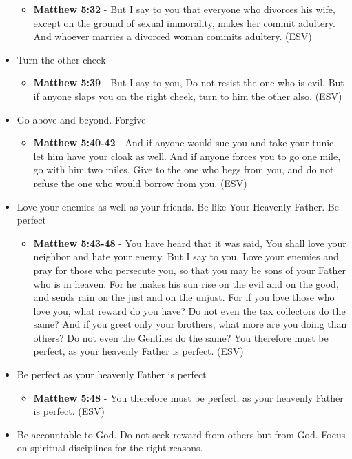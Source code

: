 \documentclass[11pt]{article}
\begin{document}
\begin{itemize}
\begin{itemize}
\item \textbf{Matthew 5:32} - But I say to you that everyone who divorces his wife, except on the ground of sexual immorality, makes her commit adultery. And whoever marries a divorced woman commits adultery. (ESV)
\end{itemize}
\item Turn the other cheek
\begin{itemize}
\item \textbf{Matthew 5:39} - But I say to you, Do not resist the one who is evil. But if anyone slaps you on the right cheek, turn to him the other also. (ESV)
\end{itemize}
\item Go above and beyond. Forgive 
\begin{itemize}
\item \textbf{Matthew 5:40-42} - And if anyone would sue you and take your tunic, let him have your cloak as well. And if anyone forces you to go one mile, go with him two miles. Give to the one who begs from you, and do not refuse the one who would borrow from you. (ESV)
\end{itemize}
\item Love your enemies as well as your friends. Be like Your Heavenly Father. Be perfect
\begin{itemize}
\item \textbf{Matthew 5:43-48} - You have heard that it was said, You shall love your neighbor and hate your enemy. But I say to you, Love your enemies and pray for those who persecute you, so that you may be sons of your Father who is in heaven. For he makes his sun rise on the evil and on the good, and sends rain on the just and on the unjust. For if you love those who love you, what reward do you have? Do not even the tax collectors do the same? And if you greet only your brothers, what more are you doing than others? Do not even the Gentiles do the same? You therefore must be perfect, as your heavenly Father is perfect. (ESV)
\end{itemize}
\item Be perfect as your heavenly Father is perfect
\begin{itemize}
\item \textbf{Matthew 5:48} - You therefore must be perfect, as your heavenly Father is perfect. (ESV)
\end{itemize}
\item Be accountable to God. Do not seek reward from others but from God. Focus on spiritual disciplines for the right reasons. 

\end{itemize}
\end{document}
